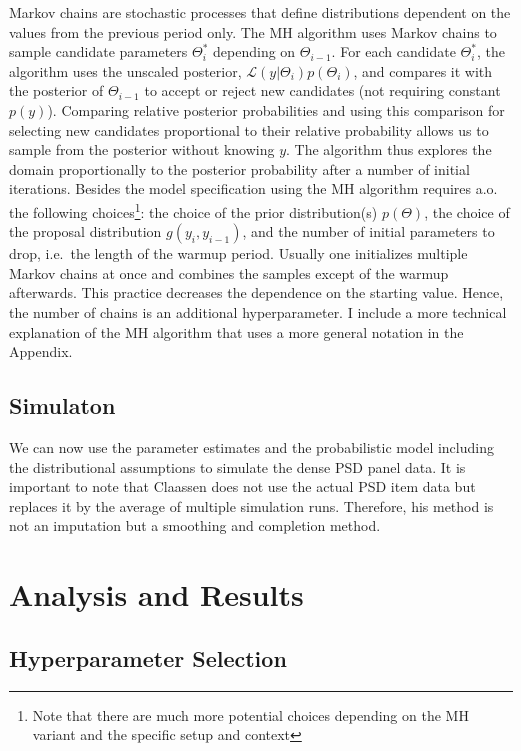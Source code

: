 \documentclass[12pt,english,a4paper,oneside]{article}
\theoremstyle{definition}
\theoremstyle{definition}
\theoremstyle{definition}
\theoremstyle{definition}
\theoremstyle{remark}
\begin{document}
Markov chains are stochastic processes that define distributions dependent on the values from the previous period only. The MH algorithm uses Markov chains to sample candidate parameters \(\Theta_i^*\) depending on \(\Theta_{i-1}\). For each candidate \(\Theta_i^*\), the algorithm uses the unscaled posterior, \(\mathcal{L}(y|\Theta_i)p(\Theta_i)\), and compares it with the posterior of \(\Theta_{i-1}\) to accept or reject new candidates (not requiring constant \(p(y)\)). Comparing relative posterior probabilities and using this comparison for selecting new candidates proportional to their relative probability allows us to sample from the posterior without knowing \(y\). The algorithm thus explores the domain proportionally to the posterior probability after a number of initial iterations. Besides the model specification using the MH algorithm requires a.o. the following choices\footnote{Note that there are much more potential choices depending on the MH variant and the specific setup and context}: the choice of the prior distribution(s) \(p(\Theta)\), the choice of the proposal distribution \(g(y_i, y_{i-1})\), and the number of initial parameters to drop, i.e.~the length of the warmup period. Usually one initializes multiple Markov chains at once and combines the samples except of the warmup afterwards. This practice decreases the dependence on the starting value. Hence, the number of chains is an additional hyperparameter. I include a more technical explanation of the MH algorithm that uses a more general notation in the Appendix.

\hypertarget{simulaton}{%
\subsection{Simulaton}\label{simulaton}}

We can now use the parameter estimates and the probabilistic model including the distributional assumptions to simulate the dense PSD panel data. It is important to note that Claassen does not use the actual PSD item data but replaces it by the average of multiple simulation runs. Therefore, his method is not an imputation but a smoothing and completion method.

\hypertarget{analysis-and-results}{%
\section{Analysis and Results}\label{analysis-and-results}}

\hypertarget{hyperparameter-selection}{%
\subsection{Hyperparameter Selection}\label{hyperparameter-selection}}
\end{document}
